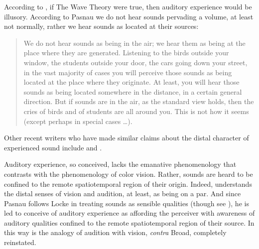 According to \citet{Pasnau:1999ss}, if The Wave Theory were true, then auditory experience would be illusory. According to Pasnau we do not hear sounds pervading a volume, at least not normally, rather we hear sounds as located at their sources:
\begin{quote}
	We do not hear sounds as being in the air; we hear them as being at the place where they are generated. Listening to the birds outside your window, the students outside your door, the cars going down your street, in the vast majority of cases you will perceive those sounds as being located at the place where they originate. At least, you will hear those sounds as being located somewhere in the distance, in a certain general direction. But if sounds are in the air, as the standard view holds, then the cries of birds and of students are all around you. This is not how it seems (except perhaps in special cases \ldots). \citep[311]{Pasnau:1999ss}
\end{quote}
Other recent writers who have made similar claims about the distal character of experienced sound include \citet{Casati:1994aa} and \citet{OCallaghan:2007xy}.

Auditory experience, so conceived, lacks the emanative phenomenology that \citet{Broad:1952kx} contrasts with the phenomenology of color vision. Rather, sounds are heard to be confined to the remote spatiotemporal region of their origin. Indeed,  \citet{Pasnau:1999ss} understands the distal senses of vision and audition, at least, as being on a par. And since Pasnau follows Locke in treating sounds as sensible qualities (though see \citealt{Pasnau:2009ys}), he is led to conceive of auditory experience as affording the perceiver with awareness of auditory qualities confined to the remote spatiotemporal region of their source. In this way is the analogy of audition with vision, \emph{contra} Broad, completely reinstated. 

